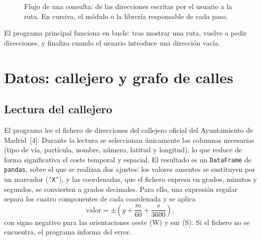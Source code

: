 \documentclass[11pt,a4paper]{article}
\newcommand{\code}[1]{\texttt{#1}}
\begin{document}
\begin{figure}[H]
\centering
{}
\caption{Flujo de una consulta: de las direcciones escritas por el usuario a la ruta. En cursiva, el módulo o la librería responsable de cada paso.}\label{fig:flujo}
\end{figure}

El programa principal funciona en bucle: tras mostrar una ruta, vuelve a pedir direcciones, y finaliza cuando el usuario introduce una dirección vacía.

\section{Datos: callejero y grafo de calles}

\subsection{Lectura del callejero}

El programa lee el fichero de direcciones del callejero oficial del Ayuntamiento de Madrid~[4]. Durante la lectura se seleccionan únicamente las columnas necesarias (tipo de vía, partícula, nombre, número, latitud y longitud), lo que reduce de forma significativa el coste temporal y espacial. El resultado es un \code{DataFrame} de \code{pandas}, sobre el que se realizan dos ajustes: los valores ausentes se sustituyen por un marcador (\code{'X'}), y las coordenadas, que el fichero expresa en grados, minutos y segundos, se convierten a grados decimales. Para ello, una expresión regular separa los cuatro componentes de cada coordenada y se aplica
\[
\text{valor} = \pm\left(g + \frac{m}{60} + \frac{s}{3600}\right),
\]
con signo negativo para las orientaciones oeste (W) y sur (S). Si el fichero no se encuentra, el programa informa del error.
\end{document}
